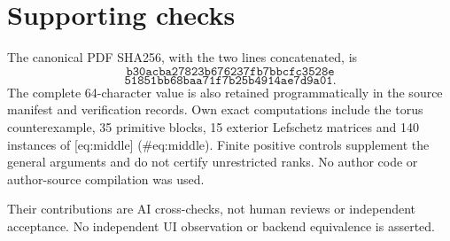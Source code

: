 \documentclass[10pt]{article}
\begin{document}
\section*{Supporting checks}
The canonical PDF SHA256, with the two lines concatenated, is \[\texttt{b30acba27823b676237fb7bbcfc3528e}\] \[\texttt{51851bb68baa71f7b25b4914ae7d9a01}.\] The complete 64-character value is also retained programmatically in the source manifest and verification records. Own exact computations include the torus counterexample, 35 primitive blocks, 15 exterior Lefschetz matrices and 140 instances of [eq:middle] (\#eq:middle). Finite positive controls supplement the general arguments and do not certify unrestricted ranks. No author code or author-source compilation was used.\par
Their contributions are AI cross-checks, not human reviews or independent acceptance. No independent UI observation or backend equivalence is asserted.\par
\end{document}

